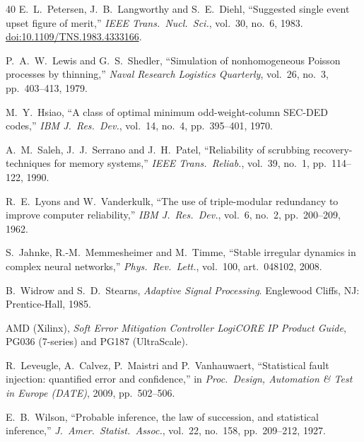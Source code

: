 \documentclass[11pt,a4paper]{article}
\begin{document}
\begin{thebibliography}{40}
E.~L.~Petersen, J.~B.~Langworthy and S.~E.~Diehl,
``Suggested single event upset figure of merit,''
\emph{IEEE Trans.\ Nucl.\ Sci.}, vol.~30, no.~6, 1983.
\href{https://doi.org/10.1109/TNS.1983.4333166}{doi:10.1109/TNS.1983.4333166}.

P.~A.~W.~Lewis and G.~S.~Shedler,
``Simulation of nonhomogeneous Poisson processes by thinning,''
\emph{Naval Research Logistics Quarterly}, vol.~26, no.~3, pp.~403--413, 1979.

M.~Y.~Hsiao,
``A class of optimal minimum odd-weight-column SEC-DED codes,''
\emph{IBM J.\ Res.\ Dev.}, vol.~14, no.~4, pp.~395--401, 1970.

A.~M.~Saleh, J.~J.~Serrano and J.~H.~Patel,
``Reliability of scrubbing recovery-techniques for memory systems,''
\emph{IEEE Trans.\ Reliab.}, vol.~39, no.~1, pp.~114--122, 1990.

R.~E.~Lyons and W.~Vanderkulk,
``The use of triple-modular redundancy to improve computer reliability,''
\emph{IBM J.\ Res.\ Dev.}, vol.~6, no.~2, pp.~200--209, 1962.

S.~Jahnke, R.-M.~Memmesheimer and M.~Timme,
``Stable irregular dynamics in complex neural networks,''
\emph{Phys.\ Rev.\ Lett.}, vol.~100, art.~048102, 2008.

B.~Widrow and S.~D.~Stearns,
\emph{Adaptive Signal Processing}.
Englewood Cliffs, NJ: Prentice-Hall, 1985.

AMD (Xilinx),
\emph{Soft Error Mitigation Controller LogiCORE IP Product Guide}, PG036 (7-series) and PG187 (UltraScale).

R.~Leveugle, A.~Calvez, P.~Maistri and P.~Vanhauwaert,
``Statistical fault injection: quantified error and confidence,''
in \emph{Proc.\ Design, Automation \& Test in Europe (DATE)}, 2009, pp.~502--506.

E.~B.~Wilson,
``Probable inference, the law of succession, and statistical inference,''
\emph{J.\ Amer.\ Statist.\ Assoc.}, vol.~22, no.~158, pp.~209--212, 1927.

\end{thebibliography}
\end{document}
